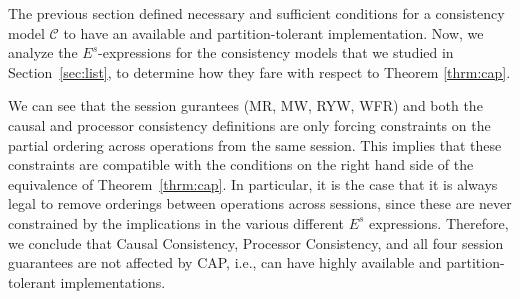 \documentclass[journal,compsoc]{IEEEtran}
\begin{document}
The previous section defined necessary and sufficient conditions for 
a consistency model $\mathcal{C}$ to have an available and partition-tolerant
implementation. Now, we analyze the $E^s$-expressions for the consistency models that we studied in Section~\ref{sec:list}, to determine how they fare with respect to Theorem \ref{thrm:cap}.

We can see that the session gurantees (MR, MW, RYW, WFR) and both the causal and processor consistency definitions are only forcing constraints on the partial ordering across operations from the same session. This implies that these constraints are compatible with the conditions on the right hand side of the equivalence of Theorem~\ref{thrm:cap}. In particular, it is the case that it is always legal to remove orderings between operations across sessions, since these are never constrained by the implications in the various different $E^s$ expressions. Therefore, we conclude that Causal Consistency, Processor Consistency, and all four session guarantees are not affected by CAP, i.e., can have highly available and partition-tolerant implementations.
\end{document}
